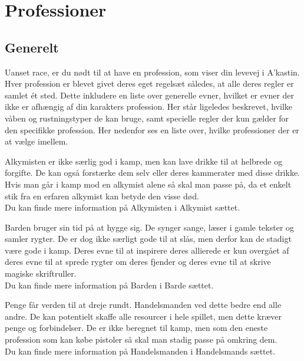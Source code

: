\chapter{Professioner}
\section{Generelt}
Uanset race, er du nødt til at have en profession, som viser din levevej i A’kastin. Hver profession er blevet givet deres eget regelsæt således, at alle deres regler er samlet ét sted. Dette inkludere en liste over generelle evner, hvilket er evner der ikke er afhængig af din karakters profession. Her står ligeledes beskrevet, hvilke våben og rustningstyper de kan bruge, samt specielle regler der kun gælder for den specifikke profession. Her nedenfor ses en liste over, hvilke professioner der er at vælge imellem. \\

\begin{prof*}[Alkymist]
Alkymisten er ikke særlig god i kamp, men kan lave drikke til at helbrede og forgifte. De kan også forstærke dem selv eller deres kammerater med disse drikke. Hvis man går i kamp mod en alkymist alene så skal man passe på, da et enkelt stik fra en erfaren alkymist kan betyde den visse død.\\
Du kan finde mere information på Alkymisten i Alkymist sættet.
\end{prof*}

\begin{prof*}[Barde]
Barden bruger sin tid på at hygge sig. De synger sange, læser i gamle tekster og samler rygter. De er dog ikke særligt gode til at slås, men derfor kan de stadigt være gode i kamp. Deres evne til at inspirere deres allierede er kun overgået af deres evne til at sprede rygter om deres fjender og deres evne til at skrive magiske skriftruller.\\
Du kan finde mere information på Barden i Barde sættet.
\end{prof*}

\begin{prof*}[Handelsmanden]
Penge får verden til at dreje rundt. Handelsmanden ved dette bedre end alle andre. De kan potentielt skaffe alle resourcer i hele spillet, men dette kræver penge og forbindelser. De er ikke beregnet til kamp, men som den eneste profession som kan købe pistoler så skal man stadig passe på omkring dem.\\
Du kan finde mere information på Handelsmanden i Handelsmands sættet.
\end{prof*}

